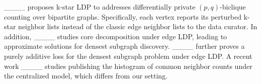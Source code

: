 ____ proposes k-star LDP to addresses differentially private $(p,q)$-biclique counting over bipartite graphs. Specifically, each vertex reports its perturbed k-star neighbor lists instead of the classic edge neighbor lists to the data curator. 
In addition, ____ studies core decomposition under edge LDP, leading to approximate solutions for densest subgraph discovery. 
____ further proves a purely additive loss for the densest subgraph problem under edge LDP. 
{A recent work ____ studies publishing the histogram of common neighbor counts under the centralized model, which differs from our setting. }







